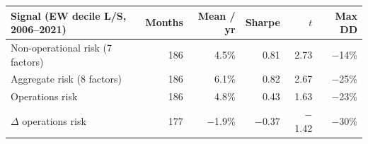 \begin{tabular}{lrrrrr}
\toprule
Signal (EW decile L/S, 2006--2021) & Months & Mean / yr & Sharpe & $t$ & Max DD \\
\midrule
Non-operational risk (7 factors) & 186 & 4.5\% & 0.81 & 2.73 & \ensuremath{-}14\% \\
Aggregate risk (8 factors) & 186 & 6.1\% & 0.82 & 2.67 & \ensuremath{-}25\% \\
Operations risk & 186 & 4.8\% & 0.43 & 1.63 & \ensuremath{-}23\% \\
$\Delta$ operations risk & 177 & \ensuremath{-}1.9\% & \ensuremath{-}0.37 & \ensuremath{-}1.42 & \ensuremath{-}30\% \\
\bottomrule
\end{tabular}
